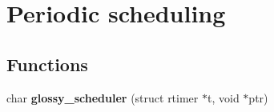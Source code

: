 \hypertarget{group__glossy-test-scheduler}{
\section{Periodic scheduling}
\label{group__glossy-test-scheduler}
}
\subsection*{Functions}
\begin{DoxyCompactItemize}
\item 
\hypertarget{group__glossy-test-scheduler_gaaf560632558b0a7395e5bc21090c04a4}{
char {\bfseries glossy\_\-scheduler} (struct rtimer $\ast$t, void $\ast$ptr)}
\label{group__glossy-test-scheduler_gaaf560632558b0a7395e5bc21090c04a4}

\end{DoxyCompactItemize}
